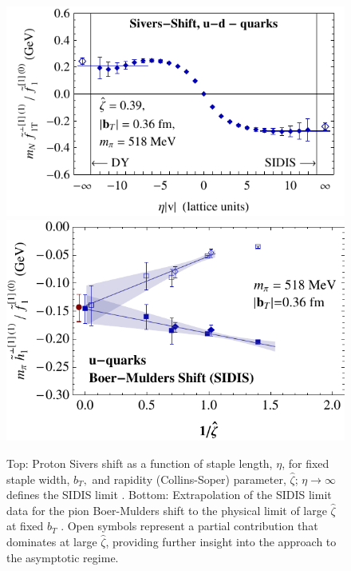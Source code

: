 \begin{figure}
	\centering
	\includegraphics[width=0.95\columnwidth]{figures/m020_run38_UminusD_Sivers_lsqr-9_zetasqrlat4}\hspace{1cm}
	\includegraphics[width=0.95\columnwidth]{figures/new_bm_u_sidis_b0p36_vszetahat_extrap_pow1}
	\caption{Top: Proton Sivers shift as a function of staple length, $\eta$, for fixed
		staple width, $b_T, $ and rapidity (Collins-Soper) parameter, $\hat{\zeta }$;
		$\eta \rightarrow \infty $ defines the SIDIS limit \cite{Musch:2011er}.
		Bottom: Extrapolation of the SIDIS limit data for the pion Boer-Mulders
		shift to the physical limit of large $\hat{\zeta }$
		at fixed $b_T $ \cite{Engelhardt:2015xja}. Open symbols represent a partial
		contribution that dominates at large $\hat{\zeta } $, providing further
		insight into the approach to the asymptotic regime.}
	\label{fig_sidis}
\end{figure}

